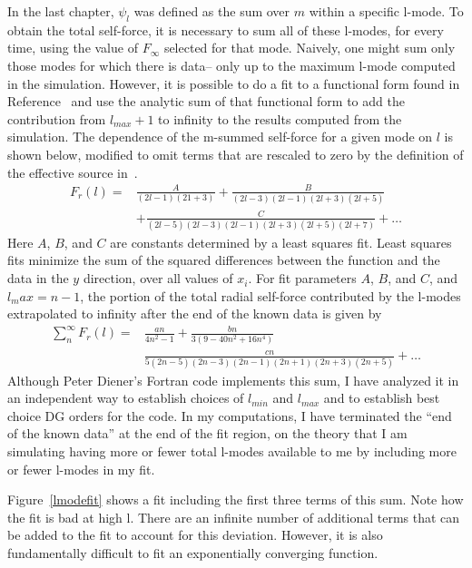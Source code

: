 In the last chapter, $\psi_l$ was defined as the sum over $m$ within a specific l-mode. To obtain the total self-force, it is necessary to sum all of these l-modes, for every time, using the value of $F_{\infty}$ selected for that mode. Naively, one might sum only those modes for which there is data-- only up to the maximum l-mode computed in the simulation. However, it is possible to do a fit to a functional form found in Reference~\cite{heffernan_ottewil_wardell_modesum_basisForCode} and use the analytic sum of that functional form to add the contribution from $l_{max}+1$ to infinity to the results computed from the simulation. The dependence of the m-summed self-force for a given mode on $l$ is shown below, modified to omit terms that are rescaled to zero by the definition of the effective source in~\cite{wardell_vega_thornberg_diener}.
\begin{eqnarray}
  F_r(l)=&\frac{A}{(2l-1)(21+3)}+\frac{B}{(2l-3)(2l-1)(2l+3)(2l+5)}\nonumber \\
  &+\frac{C}{(2l-5)(2l-3)(2l-1)(2l+3)(2l+5)(2l+7)}+\ldots
  \label{lmodefitsum}
\end{eqnarray}
Here $A$, $B$, and $C$ are constants determined by a least squares fit. Least squares fits minimize the sum of the squared differences between the function and the data in the $y$ direction, over all values of $x_i$. For fit parameters $A$, $B$, and $C$, and $l_max=n-1$, the portion of the total radial self-force contributed by the l-modes extrapolated to infinity after the end of the known data is given by
\begin{eqnarray}
  \sum_n^{\infty} F_r(l) = &\frac{an}{4n^2-1}+\frac{bn}{3(9-40n^2+16n^4)}\nonumber\\
  &\frac{cn}{5(2n-5)(2n-3)(2n-1)(2n+1)(2n+3)(2n+5)}+\ldots
\end{eqnarray}
Although Peter Diener's Fortran code implements this sum, I have analyzed it in an independent way to establish choices of $l_{min}$ and $l_{max}$ and to establish best choice DG orders for the code. In my computations, I have terminated the ``end of the known data'' at the end of the fit region, on the theory that I am simulating having more or fewer total l-modes available to me by including more or fewer l-modes in my fit.

Figure~\ref{lmodefit} shows a fit including the first three terms of this sum. Note how the fit is bad at high l. There are an infinite number of additional terms that can be added to the fit to account for this deviation. However, it is also fundamentally difficult to fit an exponentially converging function. 


